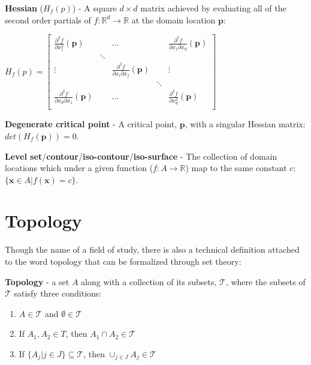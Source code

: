 \begin{defn}
  \textbf{Hessian} ($H_f(p)$) - A square $d\times d$ matrix achieved by evaluating
  all of the second order partials of $f : \mathbb{R}^d \rightarrow \mathbb{R}$ at
  the domain location $\mathbf{p}$:

  $H_f(p) =
  \begin{bmatrix}
    \frac{\partial^2f}{\partial x_1^2}(\mathbf{p}) & & \ldots & & \frac{\partial^2f}{\partial x_1\partial x_d}(\mathbf{p}) \\
     & \ddots &  &  & \\
    \vdots &  & \frac{\partial^2f}{\partial x_i\partial x_j}(\mathbf{p}) &  & \vdots \\
     & &  & \ddots & \\
    \frac{\partial^2f}{\partial x_d\partial x_1}(\mathbf{p}) & & \ldots & & \frac{\partial^2f}{\partial x_d^2}(\mathbf{p}) \\
  \end{bmatrix}$
\end{defn}

\begin{defn}
  \textbf{Degenerate critical point} - A critical point, $\mathbf{p}$, with a
  singular Hessian matrix: $det(H_f(\mathbf{p})) = 0$.
\end{defn}

\begin{defn}
 \textbf{Level set}/\textbf{contour}/\textbf{iso-contour}/\textbf{iso-surface} -
 The collection of domain locations which under a given function ($f : A
 \rightarrow \mathbb{R}$) map to the same constant $c$: $\{\mathbf{x} \in A |
 f(\mathbf{x}) = c\}$.
\end{defn}

\section{Topology}

Though the name of a field of study, there is also a technical definition attached to the word topology that can be formalized through set theory:

\begin{defn}
  \textbf{Topology} - a set $A$ along with a collection of its subsets,
  $\mathcal{T}$, where the subsets of $\mathcal{T}$ satisfy three conditions:

  \begin{enumerate}
  \item $A \in \mathcal{T}$ and $\emptyset \in \mathcal{T}$
  \item If $A_1,A_2 \in T$, then $A_1 \cap A_2 \in \mathcal{T}$
  \item If $\{A_j|j\in J\} \subseteq \mathcal{T}$, then $\cup_{j\in J} A_j \in \mathcal{T}$
  \end{enumerate}
\end{defn}

